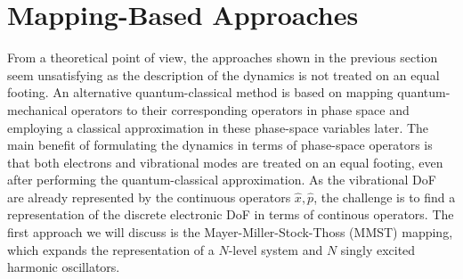 \documentclass{article}
\begin{document}
\section{Mapping-Based Approaches}
From a theoretical point of view, the approaches shown in the previous section seem unsatisfying as the description of the dynamics is not treated on an equal footing. An alternative quantum-classical method is based on mapping quantum-mechanical operators to their corresponding operators in phase space and employing a classical approximation in these phase-space variables later. The main benefit of formulating the dynamics in terms of phase-space operators is that both electrons and vibrational modes are treated on an equal footing, even after performing the quantum-classical approximation. 
As the vibrational DoF are already represented by the continuous operators $\hat{x},\hat{p}$, the challenge is to find a representation of the discrete electronic DoF in terms of continous operators. The first approach we will discuss is the Mayer-Miller-Stock-Thoss (MMST) mapping, which expands the representation of a $N$-level system and $N$ singly excited harmonic oscillators.
\end{document}

